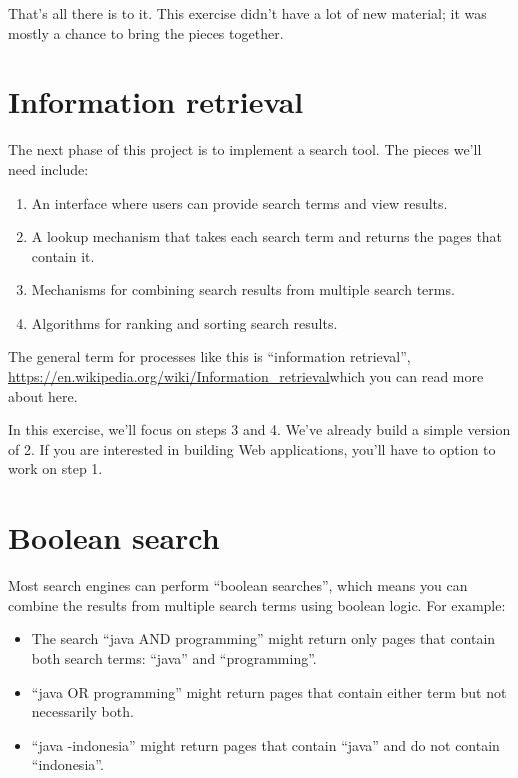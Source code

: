 \documentclass[12pt]{book}
\theoremstyle{exercise}
\begin{document}
That's all there is to it. This exercise didn't have a lot of new material;
it was mostly a chance to bring the pieces together.

\section{Information retrieval}\label{information-retrieval}

The next phase of this project is to implement a search tool. The pieces
we'll need include:

\begin{enumerate}
\def\labelenumi{\arabic{enumi}.}
\item
  An interface where users can provide search terms and view results.
\item
  A lookup mechanism that takes each search term and returns the pages
  that contain it.
\item
  Mechanisms for combining search results from multiple search terms.
\item
  Algorithms for ranking and sorting search results.
\end{enumerate}

The general term for processes like this is ``information retrieval'',
\url{https://en.wikipedia.org/wiki/Information_retrieval}{which you can
read more about here}.

In this exercise, we'll focus on steps 3 and 4. We've already build a simple
version of 2. If you are interested in building Web applications, you'll
have to option to work on step 1.

\section{Boolean search}\label{boolean-search}

Most search engines can perform ``boolean searches'', which means you
can combine the results from multiple search terms using boolean logic.
For example:

\begin{itemize}
\item
  The search ``java AND programming'' might return only pages that
  contain both search terms: ``java'' and ``programming''.
\item
  ``java OR programming'' might return pages that contain either term
  but not necessarily both.
\item
  ``java -indonesia'' might return pages that contain ``java'' and do
  not contain ``indonesia''.
\end{itemize}
\end{document}
